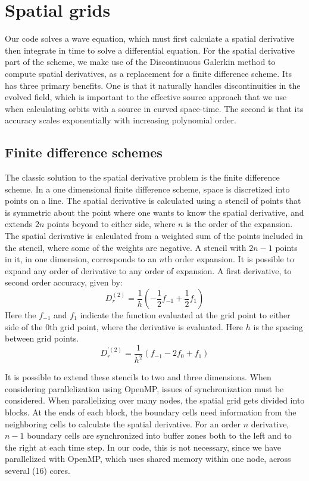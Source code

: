 \section{Spatial grids}
Our code solves a wave equation, which must first calculate a spatial derivative then integrate in time to solve a differential equation. For the spatial derivative part of the scheme, we make use of the Discontinuous Galerkin method to compute spatial derivatives, as a replacement for a finite difference scheme. Its has three primary benefits. One is that it naturally handles discontinuities in the evolved field, which is important to the effective source approach that we use when calculating orbits with a source in curved space-time. The second is that its accuracy scales exponentially with increasing polynomial order. 


\subsection{Finite difference schemes}
The classic solution to the spatial derivative problem is the finite difference scheme. In a one dimensional finite difference scheme, space is discretized into points on a line. The spatial derivative is calculated using a stencil of points that is symmetric about the point where one wants to know the spatial derivative, and extends $2n$ points beyond to either side, where $n$ is the order of the expansion. The spatial derivative is calculated from a weighted sum of the points included in the stencil, where some of the weights are negative. A stencil with $2n-1$ points in it, in one dimension, corresponds to an $n$th order expansion. It is possible to expand any order of derivative to any order of expansion. A first derivative, to second order accuracy, given by:
\begin{equation}
  D_r^{(2)}=\frac{1}{h}(-\frac{1}{2}f_{-1}+\frac{1}{2}f_1)
\end{equation}
Here the $f_{-1}$ and $f_1$ indicate the function evaluated at the grid point to either side of the $0$th grid point, where the derivative is evaluated. Here $h$ is the spacing between grid points. 
\begin{equation}
  D_r^{\prime (2)}=\frac{1}{h^2}(f_{-1}-2f_0+f_1)
\end{equation}

It is possible to extend these stencils to two and three dimensions. When considering parallelization using OpenMP, issues of synchronization must be considered. When parallelizing over many nodes, the spatial grid gets divided into blocks. At the ends of each block, the boundary cells need information from the neighboring cells to calculate the spatial derivative. For an order $n$ derivative, $n-1$ boundary cells are synchronized into buffer zones both to the left and to the right at each time step. In our code, this is not necessary, since we have parallelized with OpenMP, which uses shared memory within one node, across several (16) cores.

